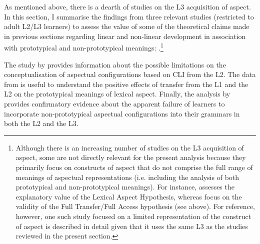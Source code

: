\documentclass[output=paper,modfonts,nonflat,newtxmath]{langsci/langscibook}
\begin{document}
As mentioned above, there is a dearth of studies on the L3 acquisition of aspect. In this section, I summarise the findings from three relevant studies (restricted to adult L2/L3 learners) to assess the value of some of the theoretical claims made in previous sections regarding linear and non-linear development in association with prototypical and non-prototypical meanings: \citet{Salaberry2005, Foote2009, DiaubalickGuijarro-Fuentes2016}.\footnote{Although there is an increasing number of studies on the L3 acquisition of aspect, some are not directly relevant for the present analysis because they primarily focus on constructs of aspect that do not comprise the full range of meanings of aspectual representations (i.e. including the analysis of both prototypical and non-prototypical meanings). For instance, \citet{Fessi2013} assesses the explanatory value of the Lexical Aspect Hypothesis, whereas \citet{KarpavaEtAl2012} focus on the validity of the Full Transfer/Full Access hypothesis (see  above). For reference, however, one such study focused on a limited representation of the construct of aspect \citep{Foote2009} is described in detail given that it uses the same L3 as the studies reviewed in the present section.}

The study by \citeauthor{Salaberry2005} provides information about the possible limitations on the conceptualisation of aspectual configurations based on CLI from the L2. The data from \citeauthor{Foote2009} is useful to understand the positive effects of transfer from the L1 and the L2 on the prototypical meanings of lexical aspect. Finally, the analysis by \citeauthor{DiaubalickGuijarro-Fuentes2016} provides confirmatory evidence about the apparent failure of learners to incorporate non-prototypical aspectual configurations into their grammars in both the L2 and the L3.
\end{document}
